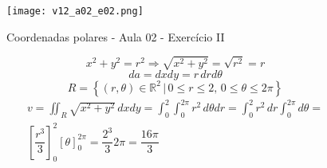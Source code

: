 \begin{enumerate}
	\begin{figure}[htb]
		\caption{Coordenadas polares - Aula 02 - Exercício II}
		\label{v12_a02_e02}
		\centering
		\texttt{[image: v12\_a02\_e02.png]}		
	\end{figure}	
	
	\begin{equation*}
		x^2 + y^2 = r^2 \Rightarrow \sqrt{x^2 + y^2} = \sqrt{r^2} = r
	\end{equation*}
	\begin{equation*}
		da = dx dy = r\, dr d\theta
	\end{equation*}
	\begin{equation*}
		R = \left\{(r, \theta) \in \mathbb{R}^2 \,|\, 0 \leq r \leq 2,\, 0 \leq \theta \leq 2\pi\right\}
	\end{equation*}
	\begin{gather*}
		v = \iint_R \sqrt{x^2 + y^2}\, dxdy = \int_0^2 \int_0^{2\pi} r^2\,d\theta dr = \int_0^2 r^2\, dr \int_0^{2\pi} d\theta =\\ \left[\dfrac{r^3}{3}\right]_0^2 [\theta]_0^{2\pi} = \dfrac{2^3}{3}2\pi = \dfrac{16\pi}{3}
	\end{gather*}
\end{enumerate}